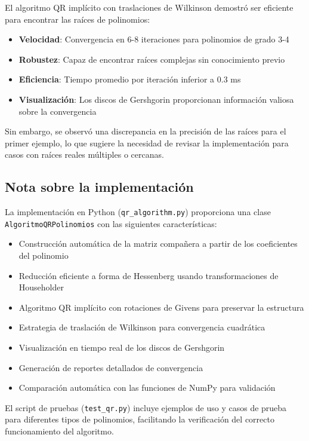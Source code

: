 \documentclass[12pt]{article}
\begin{document}
El algoritmo QR implícito con traslaciones de Wilkinson demostró ser eficiente para encontrar las raíces de polinomios:

\begin{itemize}
    \item \textbf{Velocidad}: Convergencia en 6-8 iteraciones para polinomios de grado 3-4
    \item \textbf{Robustez}: Capaz de encontrar raíces complejas sin conocimiento previo
    \item \textbf{Eficiencia}: Tiempo promedio por iteración inferior a 0.3 ms
    \item \textbf{Visualización}: Los discos de Gershgorin proporcionan información valiosa sobre la convergencia
\end{itemize}

Sin embargo, se observó una discrepancia en la precisión de las raíces para el primer ejemplo, lo que sugiere la necesidad de revisar la implementación para casos con raíces reales múltiples o cercanas.

\subsection{Nota sobre la implementación}

La implementación en Python (\texttt{qr\_algorithm.py}) proporciona una clase \texttt{AlgoritmoQRPolinomios} con las siguientes características:
\begin{itemize}
    \item Construcción automática de la matriz compañera a partir de los coeficientes del polinomio
    \item Reducción eficiente a forma de Hessenberg usando transformaciones de Householder
    \item Algoritmo QR implícito con rotaciones de Givens para preservar la estructura
    \item Estrategia de traslación de Wilkinson para convergencia cuadrática
    \item Visualización en tiempo real de los discos de Gershgorin
    \item Generación de reportes detallados de convergencia
    \item Comparación automática con las funciones de NumPy para validación
\end{itemize}

El script de pruebas (\texttt{test\_qr.py}) incluye ejemplos de uso y casos de prueba para diferentes tipos de polinomios, facilitando la verificación del correcto funcionamiento del algoritmo.
\vspace{2cm}
\end{document}
